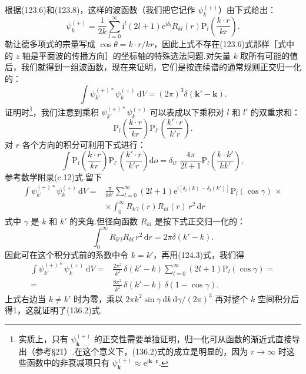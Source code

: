 根据(123.6)和(123.8)，这样的波函数（我们把它记作 $\psi_{k}^{(+)}$）由下式给出：
\begin{equation}
  \psi_{k}^{(+)}=\frac{1}{2k}\sum_{l=0}^{\infty}\mathrm{i}^{l}(2l+1)
  \mathrm{e}^{\mathrm{i}\delta_l}R_{kl}(r)
  \mathrm{P}_l\left(\frac{k\cdot r}{kr}\right).
\end{equation}
勒让德多项式的宗量写成 $\cos\theta=k\cdot r/kr$，因此上式不存在(123.6)式那样［式中的 $z$ 轴是平面波的传播方向］的坐标轴的特殊选法问题.对矢量 $k$ 取所有可能的值后，我们就得到一组波函数，现在来证明，它们是按连续谱的通常规则正交归一化的：
\begin{equation}
  \int\psi_{k'}^{(+)*}\psi_{k}^{(+)}\,\mathrm{d}V
  =(2\pi)^3\delta(\boldsymbol{k}'-\boldsymbol{k}).
\end{equation}
证明时\footnote{实质上，只有 $\psi_{\boldsymbol{k}}^{(+)}$ 的正交性需要单独证明，归一化可从函数的渐近式直接导出（参考§21）.在这个意义下，(136.2)式的成立是明显的，因为 $r\to\infty$ 时这些函数中的非衰减项只有 $\psi_{\boldsymbol{k}}^{(+)}\approx\mathrm{e}^{\mathrm{i}\boldsymbol{k}\cdot\boldsymbol{r}}$.}，我们注意到乘积 $\psi_{k'}^{(+)*}\psi_{k}^{(+)}$ 可以表成以下乘积对 $l$ 和 $l'$ 的双重求和：
\begin{equation*}
  \mathrm{P}_l\left(\frac{k\cdot r}{kr}\right)
  \mathrm{P}_{l'}\left(\frac{k'\cdot r}{k'r}\right).
\end{equation*}
对 $r$ 各个方向的积分可利用下式进行：
\begin{equation}
  \int\mathrm{P}_l\left(\frac{k\cdot r}{kr}\right)
  \mathrm{P}_{l'}\left(\frac{k'\cdot r}{k'r}\right)\mathrm{d}o
  =\delta_{ll'}\,\frac{4\pi}{2l+1}
  \mathrm{P}_l\left(\frac{k\cdot k'}{kk'}\right),
\end{equation}
参考数学附录(c.12)式.留下
\begin{equation*}
\begin{aligned}
  \int\psi_{k'}^{(+)*}\psi_{k}^{(+)}\,\mathrm{d}V
  ={}&\frac{\pi}{kk'}\sum_{l=0}^{\infty}(2l+1)
  \mathrm{e}^{\mathrm{i}\left[\delta_l(k)-\delta_l(k')\right]}
  \mathrm{P}_l(\cos\gamma)\,\times\\
  &\times\int_0^{\infty}R_{k'l}(r)R_{kl}(r)\,r^2\,\mathrm{d}r
\end{aligned}
\end{equation*}
式中 $\gamma$ 是 $k$ 和 $k'$ 的夹角.但径向函数 $R_{kl}$ 是按下式正交归一化的：
\begin{equation*}
  \int_0^{\infty}R_{k'l}R_{kl}\,r^2\,\mathrm{d}r
  =2\pi\delta(k'-k).
\end{equation*}
因此可在这个积分式前的系数中令 $k=k'$，再用(124.3)式，我们得
\begin{equation*}
\begin{aligned}
  \int\psi_{k'}^{(+)*}\psi_{k}^{(+)}\,\mathrm{d}V
  ={}&\frac{2\pi^2}{k^2}\,\delta(k'-k)
  \sum_{l=0}^{\infty}(2l+1)\mathrm{P}_l(\cos\gamma)=\\
  ={}&\frac{8\pi^2}{k^2}\,\delta(k'-k)\,
  \delta(1-\cos\gamma).
\end{aligned}
\end{equation*}
上式右边当 $k\neq k'$ 时为零，乘以 $2\pi k^2\sin\gamma\,\mathrm{d}k\,\mathrm{d}\gamma/(2\pi)^3$ 再对整个 $k$ 空间积分后得1，这就证明了(136.2)式.

